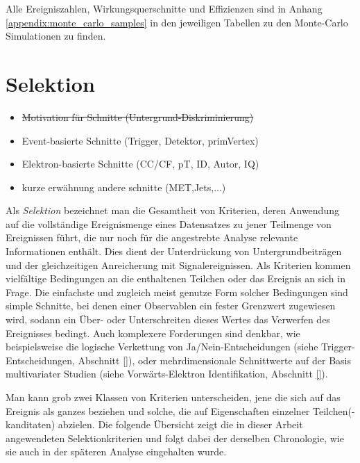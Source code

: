 Alle Ereigniszahlen, Wirkungsquerschnitte und Effizienzen sind in Anhang
\ref{appendix:monte_carlo_samples} in den jeweiligen Tabellen zu den
Monte-Carlo Simulationen zu finden.



\section{Selektion}
\label{data_sim_selection:selection}

\begin{itemize}
    \item \sout{Motivation für Schnitte (Untergrund-Diskriminierung)}
    \item Event-basierte Schnitte (Trigger, Detektor, primVertex)
    \item Elektron-basierte Schnitte (CC/CF, pT, ID, Autor, IQ)
    \item kurze erwähnung andere schnitte (MET,Jets,...)
\end{itemize}

Als \textit{Selektion} bezeichnet man die Gesamtheit von Kriterien, deren
Anwendung auf die vollständige Ereignismenge eines Datensatzes zu jener
Teilmenge von Ereignissen führt, die nur noch für die angestrebte Analyse
relevante Informationen enthält. Dies dient der Unterdrückung von
Untergrundbeiträgen und der gleichzeitigen Anreicherung mit Signalereignissen.
Als Kriterien kommen vielfältige Bedingungen an die enthaltenen Teilchen oder
das Ereignis an sich in Frage. Die einfachste und zugleich meist genutze Form
solcher Bedingungen sind simple Schnitte, bei denen einer Observablen ein
fester Grenzwert zugewiesen wird, sodann ein Über- oder Unterschreiten dieses
Wertes das Verwerfen des Ereignisses bedingt. Auch komplexere Forderungen sind
denkbar, wie beispielsweise die logische Verkettung von Ja/Nein-Entscheidungen
(siehe Trigger-Entscheidungen, Abschnitt \ref{}),
oder mehrdimensionale Schnittwerte auf der Basis multivariater Studien (siehe
Vorwärts-Elektron Identifikation, Abschnitt \ref{}).

Man kann grob zwei Klassen von Kriterien unterscheiden, jene die sich auf das
Ereignis als ganzes beziehen und solche, die auf Eigenschaften einzelner
Teilchen(-kanditaten) abzielen. Die folgende Übersicht zeigt die in dieser
Arbeit angewendeten Selektionkriterien und folgt dabei der derselben
Chronologie, wie sie auch in der späteren Analyse eingehalten wurde.

